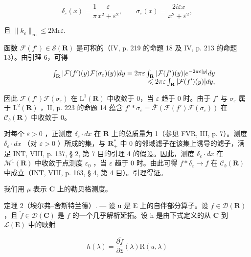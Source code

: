 \[
\delta_ {\varepsilon} (x) = \frac {1}{\pi} \frac {\varepsilon}{x ^ {2} + \varepsilon^ {2}}, \qquad \sigma_ {\varepsilon} (x) = \frac {2 i \varepsilon x}{x ^ {2} + \varepsilon^ {2}},
\]

且 \(\| k_{\varepsilon}\|_{\infty}\leqslant 2\mathrm{Mr}\varepsilon .\)

函数 \(\mathcal{F}(f') \in \mathcal{S}(\mathbf{R})\) 是可积的（IV, p. 219 的命题 18 及 IV, p. 213 的命题 13）。由引理 6，可得

\[
\begin{array}{r l r} & & {\int_ {\mathbf {R}} | \mathcal {F} (f ^ {\prime}) (y) \mathcal {F} (\sigma_ {\varepsilon}) (y) | d y = 2 \pi \varepsilon \int_ {\mathbf {R}} | \mathcal {F} (f ^ {\prime}) (y) | e ^ {- 2 \pi \varepsilon | y |} d y} \\ & & {\leqslant 2 \pi \varepsilon \int_ {\mathbf {R}} | \mathcal {F} (f ^ {\prime}) (y) | d y,} \end{array}
\]

因此 \(\mathcal{F}(f')\mathcal{F}(\sigma_{\varepsilon})\) 在 \(\mathrm{L}^{1}(\mathbf{R})\) 中收敛于 0，当 \(\varepsilon\) 趋于 0 时。由于 \(f'\) 与 \(\sigma_{\varepsilon}\) 属于 \(\mathrm{L}^{2}(\mathbf{R})\) ，II, p. 223 的命题 14 蕴含 \(f'*\sigma_{\varepsilon}=\overline{\mathcal{F}}(\mathcal{F}(f')\mathcal{F}(\sigma_{\varepsilon}))\) 在 \(\mathcal{C}_{b}(\mathbf{R})\) 中收敛于 0。

对每个 \(\varepsilon > 0\) ，正测度 \(\delta_{\varepsilon} \cdot dx\) 在 \(\mathbf{R}\) 上的总质量为 1（参见 FVR, III, p. 7）。测度 \(\delta_{\varepsilon} \cdot dx\) （对 \(\varepsilon > 0\) ）所成的集，与 \(\mathbf{R}_{+}^{*}\) 中 0 的邻域滤子在该集上诱导的滤子，满足 INT, VIII, p. 137, § 2, 第 7 目的引理 4 的假设。因此，测度 \(\delta_{\varepsilon} \cdot dx\) 在 \(\mathcal{M}^{1}(\mathbf{R})\) 中收敛于点测度 \(\varepsilon_{0}\) ，当 \(\varepsilon\) 趋于 0 时。由此可得 \(f * \delta_{\varepsilon} \to f\) 在 \(\mathcal{C}_{b}(\mathbf{R})\) 中成立（INT, VIII, p. 163, § 4, 第 4 目）。引理得证。

我们用 \(\mu\) 表示 \(\mathbf{C}\) 上的勒贝格测度。

定理 2（埃尔弗--舍斯特兰德）. --- 设 u 是 E 上的自伴部分算子。设 \(f \in \mathcal{D}(\mathbf{R})\) ，且 \(\widetilde{f} \in \mathcal{D}(\mathbf{C})\) 是 \(f\) 的一个几乎解析延拓。设 h 是由下式定义的从 \(\mathbf{C}\) 到 \(\mathcal{L}(\mathrm{E})\) 中的映射

\[
h (\lambda) = \frac {\partial \widetilde {f}}{\partial \overline {{z}}} (\lambda) \mathrm{R} (u, \lambda)
\]

